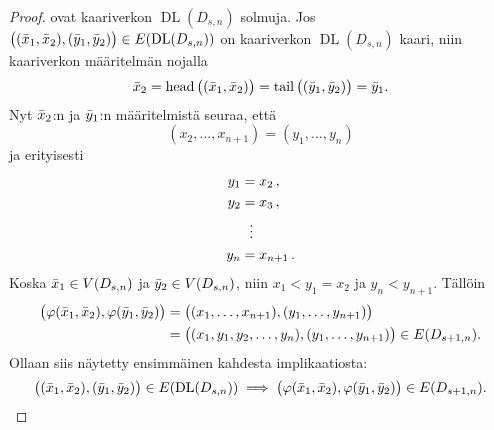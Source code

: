 \documentclass[finnish]{tktltiki2}
\theoremstyle{definition}
\theoremstyle{remark}
\DeclareMathOperator{\head}{head}
\DeclareMathOperator{\tail}{tail}
\DeclareMathOperator{\DL}{DL}
\newcommand{\Dsn}{D_{s,n}}
\newcommand{\Dssn}{D_{s+1,n}}
\begin{document}
\begin{proof}
    ovat kaariverkon $\DL(\Dsn)$ solmuja. Jos $\big((\x_1, \x_2), (\y_1,
    \y_2)\big) \in E(\DL(\Dsn))$ on kaariverkon $\DL(\Dsn)$ kaari, niin
    kaariverkon määritelmän nojalla
    \begin{equation*}
        \x_2 = \head\big((\x_1,\x_2)\big)
             = \tail\big((\y_1, \y_2)\big)
             = \y_1.
    \end{equation*}
    Nyt $\bar{x}_2$:n ja $\bar{y}_1$:n määritelmistä seuraa, että
    \begin{equation*}
        (x_2, \dots, x_{n+1}) = (y_1, \dots, y_n)
    \end{equation*}
    ja erityisesti
    \begin{align*}
        y_1 &= x_2\,, \\
        y_2 &= x_3\,, \\
            &\hspace{2.2mm}\vdots \\
        y_n &= x_{n+1}\,.
    \end{align*}
    Koska $\x_1 \in V(\Dsn)$ ja $\y_2 \in V(\Dsn)$, niin
    $x_1 < y_1 = x_2$ ja $y_n < y_{n+1}$. Tällöin
    \begin{align*}
        \big(
            \varphi(\x_1, \x_2), \varphi(\y_1, \y_2)
        \big)
            &= \big(
                   (x_1, \dots, x_{n+1}), (y_1, \dots, y_{n+1})
               \big) \\
            &= \big(
                   (x_1, y_1, y_2, \dots, y_n), (y_1, \dots, y_{n+1})
               \big) \in E(\Dssn).
    \end{align*}
    Ollaan siis näytetty ensimmäinen kahdesta implikaatiosta:
    \begin{equation*}
        \big((\x_1, \x_2), (\y_1, \y_2)\big) \in E(\DL(\Dsn)) \implies
        \big(\varphi(\x_1, \x_2), \varphi(\y_1, \y_2) \big) \in E(\Dssn).
    \end{equation*}


\end{proof}
\end{document}
